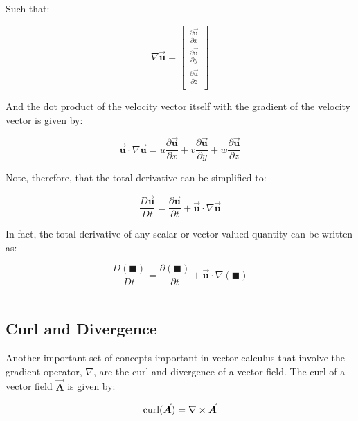 \documentclass[11pt]{article}
\begin{document}
\noindent
Such that:

\begin{equation*}
    \nabla \vec{\bm{u}} = \begin{bmatrix}
                            \frac{\partial\vec{\bm{u}}}{\partial x} \\
                            \frac{\partial\vec{\bm{u}}}{\partial y} \\
                            \frac{\partial\vec{\bm{u}}}{\partial z} \\
                            \end{bmatrix}
\end{equation*}

\noindent
And the dot product of the velocity vector itself with the gradient of the velocity vector is given by:

\begin{equation*}
    \vec{\bm{u}} \cdot \nabla \vec{\bm{u}} = u\frac{\partial\vec{\bm{u}}}{\partial x} + v\frac{\partial\vec{\bm{u}}}{\partial y} + w\frac{\partial\vec{\bm{u}}}{\partial z}
\end{equation*}

\noindent
Note, therefore, that the total derivative can be simplified to:

\begin{equation*}
    \frac{D\vec{\bm{u}}}{Dt} = \frac{\partial\vec{\bm{u}}}{\partial t} + \vec{\bm{u}} \cdot \nabla \vec{\bm{u}}
\end{equation*}

\noindent
In fact, the total derivative of any scalar or vector-valued quantity can be written as:

\begin{equation*}
    \frac{D(\blacksquare)}{Dt} = \frac{\partial(\blacksquare)}{\partial t} + \vec{\bm{u}} \cdot \nabla (\blacksquare)
\end{equation*} \\

\subsection{Curl and Divergence}
\noindent
Another important set of concepts important in vector calculus that involve the gradient operator, $\nabla$, are the curl and divergence of a vector field. The curl of a vector field $\vec{\bm{A}}$ is given by:

\begin{equation*}
    \textnormal{curl}(\vec{\bm{A}}) = \nabla \times \vec{\bm{A}}
\end{equation*}
\end{document}
